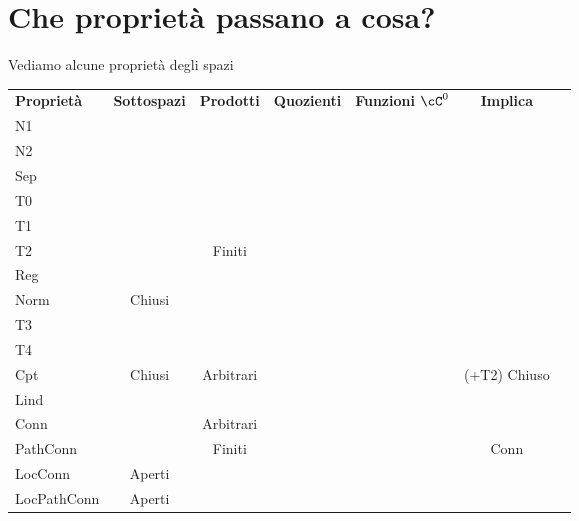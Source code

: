 \documentclass[a4paper,NoNotes,GeneralMath]{stdmdoc}
\begin{document}
	\section*{Che proprietà passano a cosa?}
	Vediamo alcune proprietà degli spazi \\
	\begin{tabular}{lcccccc}
	{\bf Proprietà} & {\bf Sottospazi} & {\bf Prodotti} & {\bf Quozienti} & {\bf Funzioni $\cC^0$} & {\bf Implica} \\
	N1              &                  &                &                 &                        &               \\ \hline
	N2              &                  &                &                 &                        &               \\ \hline
	Sep             &                  &                &                 &                        &               \\ \hline
	T0              & \checkmark       &                &                 &                        &               \\ \hline

	T1              & \checkmark       &                &                 &                        &               \\ \hline
	T2              & \checkmark       & Finiti         &                 &                        &               \\ \hline
	Reg             & \checkmark       &                &                 &                        &               \\ \hline
	Norm            & Chiusi           &                &                 &                        &               \\ \hline

	T3              & \checkmark       &                &                 &                        &               \\ \hline
	T4              &                  &                &                 &                        &               \\ \hline
	Cpt             & Chiusi           & Arbitrari      &                 & \checkmark             & (+T2) Chiuso  \\ \hline
	Lind            &                  &                &                 &                        &               \\ \hline

	Conn            &                  & Arbitrari      &                 & \checkmark             &               \\ \hline
	PathConn        &                  & Finiti         &                 & \checkmark             & Conn          \\ \hline
	LocConn         & Aperti           &                &                 &                        &               \\ \hline
	LocPathConn     & Aperti           &                &                 &                        &               \\ \hline
	\end{tabular} \vskip 1.5cm
	
\end{document}
